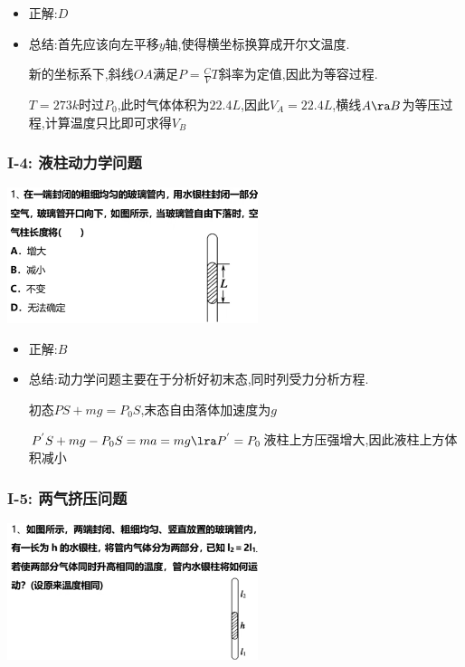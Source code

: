 \documentclass{article}
\begin{document}
\begin{itemize}
    \item 正解:\quad $D$
    \item 总结:\quad 首先应该向左平移$y$轴,使得横坐标换算成开尔文温度.

          \hspace{3.3em}新的坐标系下,斜线$OA$满足$P = \frac{C}{V}T$斜率为定值,因此为等容过程.

          \hspace{3.3em}$T = 273k$时过$P_{0}$,此时气体体积为$22.4L$,因此$V_{A} = 22.4L$,横线$A \ra B$为等压过程,计算温度只比即可求得$V_{B}$
\end{itemize}

\vspace{2em}

\subsubsection{I-4: 液柱动力学问题}
\includegraphics[width = 0.55\textwidth,keepaspectratio]{./pictures/2.3-4.png}

\begin{itemize}
    \item 正解:\quad $B$
    \item 总结:\quad 动力学问题主要在于分析好初末态,同时列受力分析方程.

          \hspace{3.3em}初态$PS + mg = P_{0}S$,末态自由落体加速度为$g$

          \hspace{3.3em}$P^{'}S + mg - P_{0}S = ma = mg \lra P^{'} = P_{0}$液柱上方压强增大,因此液柱上方体积减小
\end{itemize}

\vspace{2em}

\subsubsection{I-5: 两气挤压问题}
\includegraphics[width = 0.55\textwidth,keepaspectratio]{./pictures/2.3-5.png}
\end{document}
